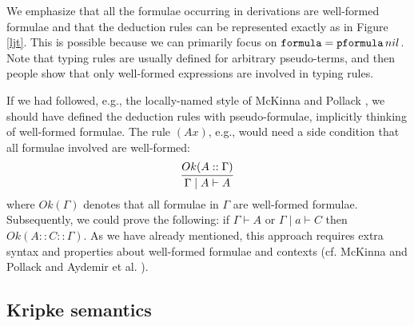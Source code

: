 \documentclass{svjour3}                     %
\newcommand{\seq}[2]{\infer{#2}{#1}}
\newcommand{\Ga}{\Gamma}
\newcommand{\vd}{\vdash}
\newcommand{\tpfml}{\textup{\tt pformula}}
\newcommand{\tfml}{\textup{\tt formula}}
\begin{document}
We emphasize that all the formulae occurring in derivations are well-formed formulae and that the deduction rules can be represented exactly as in Figure \ref{ljt}. This is possible because we can primarily focus on $\tfml = \tpfml \, nil$. 
Note that typing rules are usually defined for arbitrary pseudo-terms, and then people show that only well-formed expressions are involved in typing rules.

  If we had followed, e.g., the locally-named style of McKinna and Pollack \cite{mcpol93,mcpol99}, we should have defined the deduction rules with pseudo-formulae, implicitly thinking of well-formed formulae. The rule $(Ax)$, e.g., would need a side condition that all formulae involved are well-formed:
  \[
  \seq{Ok(A::\Ga)}{\Ga \mid A \vd A}
  \]
  where $Ok(\Ga)$ denotes that all formulae in $\Ga$ are well-formed formulae. Subsequently, we could prove the following: if $\Ga \vdash A$ or $\Ga \mid a \vdash C$ then $Ok(A::C::\Ga)$.
  As we have already mentioned, this approach requires extra syntax and properties about well-formed formulae and contexts (cf. McKinna and Pollack \cite{mcpol93,mcpol99} and Aydemir et al. \cite{engineering}).
  
\subsection{Kripke semantics}
\end{document}
